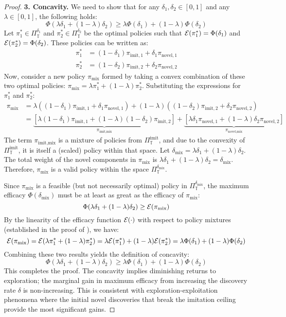 \begin{proof}
\noindent\textbf{3. Concavity.}
We need to show that for any $\delta_1, \delta_2 \in [0, 1]$ and any $\lambda \in [0, 1]$, the following holds:
\[
\Phi(\lambda\delta_1 + (1-\lambda)\delta_2) \ge \lambda\Phi(\delta_1) + (1-\lambda)\Phi(\delta_2)
\]
Let $\pi_1^* \in \Pi_{\mathbb{T}}^{\delta_1}$ and $\pi_2^* \in \Pi_{\mathbb{T}}^{\delta_2}$ be the optimal policies such that $\mathcal{E}(\pi_1^*) = \Phi(\delta_1)$ and $\mathcal{E}(\pi_2^*) = \Phi(\delta_2)$. These policies can be written as:
\begin{align*}
\pi_1^* &= (1-\delta_1)\pi_{\text{imit},1} + \delta_1\pi_{\text{novel},1} \\
\pi_2^* &= (1-\delta_2)\pi_{\text{imit},2} + \delta_2\pi_{\text{novel},2}
\end{align*}
Now, consider a new policy $\pi_{\text{mix}}$ formed by taking a convex combination of these two optimal policies: $\pi_{\text{mix}} = \lambda\pi_1^* + (1-\lambda)\pi_2^*$. Substituting the expressions for $\pi_1^*$ and $\pi_2^*$:
\begin{align*}
\pi_{\text{mix}} &= \lambda((1-\delta_1)\pi_{\text{imit},1} + \delta_1\pi_{\text{novel},1}) + (1-\lambda)((1-\delta_2)\pi_{\text{imit},2} + \delta_2\pi_{\text{novel},2}) \\
&= \underbrace{[\lambda(1-\delta_1)\pi_{\text{imit},1} + (1-\lambda)(1-\delta_2)\pi_{\text{imit},2}]}_{\pi_{\text{imit,mix}}} + \underbrace{[\lambda\delta_1\pi_{\text{novel},1} + (1-\lambda)\delta_2\pi_{\text{novel},2}]}_{\pi_{\text{novel,mix}}}
\end{align*}
The term $\pi_{\text{imit,mix}}$ is a mixture of policies from $\Pi_{\mathbb{T}}^{\text{imit}}$, and due to the convexity of $\Pi_{\mathbb{T}}^{\text{imit}}$, it is itself a (scaled) policy within that space.
Let $\delta_{\text{mix}} = \lambda\delta_1 + (1-\lambda)\delta_2$. The total weight of the novel components in $\pi_{\text{mix}}$ is $\lambda\delta_1 + (1-\lambda)\delta_2 = \delta_{\text{mix}}$. Therefore, $\pi_{\text{mix}}$ is a valid policy within the space $\Pi_{\mathbb{T}}^{\delta_{\text{mix}}}$.

Since $\pi_{\text{mix}}$ is a feasible (but not necessarily optimal) policy in $\Pi_{\mathbb{T}}^{\delta_{\text{mix}}}$, the maximum efficacy $\Phi(\delta_{\text{mix}})$ must be at least as great as the efficacy of $\pi_{\text{mix}}$:
\[
\Phi(\lambda\delta_1 + (1-\lambda)\delta_2) \ge \mathcal{E}(\pi_{\text{mix}})
\]
By the linearity of the efficacy function $\mathcal{E}(\cdot)$ with respect to policy mixtures (established in the proof of ), we have:
\[
\mathcal{E}(\pi_{\text{mix}}) = \mathcal{E}(\lambda\pi_1^* + (1-\lambda)\pi_2^*) = \lambda\mathcal{E}(\pi_1^*) + (1-\lambda)\mathcal{E}(\pi_2^*) = \lambda\Phi(\delta_1) + (1-\lambda)\Phi(\delta_2)
\]
Combining these two results yields the definition of concavity:
\[
\Phi(\lambda\delta_1 + (1-\lambda)\delta_2) \ge \lambda\Phi(\delta_1) + (1-\lambda)\Phi(\delta_2)
\]
This completes the proof. The concavity implies diminishing returns to exploration; the marginal gain in maximum efficacy from increasing the discovery rate $\delta$ is non-increasing. This is consistent with exploration-exploitation phenomena where the initial novel discoveries that break the imitation ceiling provide the most significant gains.
\end{proof}


